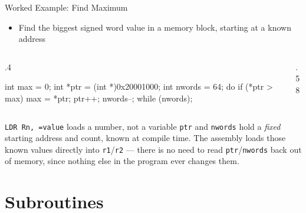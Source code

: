 \documentclass[9pt,aspectratio=169,xcolor=table]{beamer}
\begin{document}
\begin{frame}[fragile]{Worked Example: Find Maximum}
    \begin{itemize}
        \item Find the biggest signed word value in a memory block, starting at a known address
    \end{itemize}

    \vspace{1mm}
    \begin{columns}[T]
    \begin{column}{.4\textwidth}
        \begin{cc}
int max = 0;
int *ptr = (int *)0x20001000;
int nwords = 64;
do {
    if (*ptr > max)
        max = *ptr;
    ptr++;
    nwords--;
} while (nwords);
        \end{cc}
    \end{column}
    \begin{column}{.58\textwidth}
    \end{column}
    \end{columns}

    \vspace{2mm}
    \begin{block}{\texttt{LDR Rn, =value} loads a number, not a variable}
        \texttt{ptr} and \texttt{nwords} hold a \emph{fixed} starting
        address and count, known at compile time. The assembly loads
        those known values directly into \texttt{r1}/\texttt{r2} ---
        there is no need to read \texttt{ptr}/\texttt{nwords} back out
        of memory, since nothing else in the program ever changes them.
    \end{block}
\end{frame}


\section{Subroutines}
\end{document}
